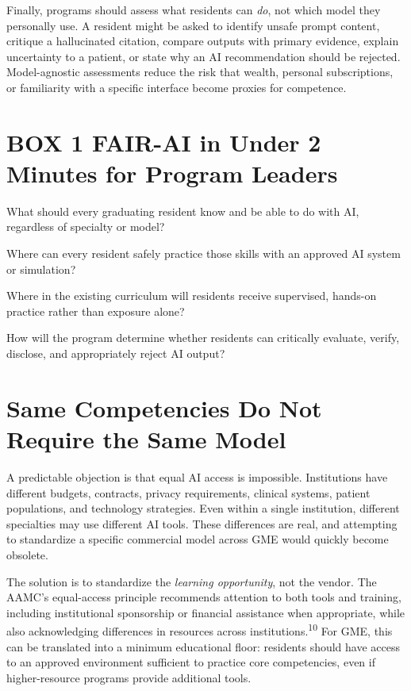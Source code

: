 \documentclass[12pt]{article}
\begin{document}
Finally, programs should assess what residents can \emph{do}, not which model
they personally use. A resident might be asked to identify unsafe prompt
content, critique a hallucinated citation, compare outputs with primary
evidence, explain uncertainty to a patient, or state why an AI recommendation
should be rejected. Model-agnostic assessments reduce the risk that wealth,
personal subscriptions, or familiarity with a specific interface become
proxies for competence.

\section*{BOX 1 \quad FAIR-AI in Under 2 Minutes for Program Leaders}

\begin{description}[style=nextline,leftmargin=0pt]
  \item[\textbf{F: Foundational expectations}]
  What should every graduating resident know and be able to do with AI,
  regardless of specialty or model?

  \item[\textbf{A: Access}]
  Where can every resident safely practice those skills with an approved AI
  system or simulation?

  \item[\textbf{I: Instruction}]
  Where in the existing curriculum will residents receive supervised,
  hands-on practice rather than exposure alone?

  \item[\textbf{R: Review}]
  How will the program determine whether residents can critically evaluate,
  verify, disclose, and appropriately reject AI output?
\end{description}

\section*{Same Competencies Do Not Require the Same Model}

A predictable objection is that equal AI access is impossible. Institutions
have different budgets, contracts, privacy requirements, clinical systems,
patient populations, and technology strategies. Even within a single
institution, different specialties may use different AI tools. These
differences are real, and attempting to standardize a specific commercial
model across GME would quickly become obsolete.

The solution is to standardize the \emph{learning opportunity}, not the
vendor. The AAMC's equal-access principle recommends attention to both tools
and training, including institutional sponsorship or financial assistance
when appropriate, while also acknowledging differences in resources across
institutions.\textsuperscript{10} For GME, this can be translated into a
minimum educational floor: residents should have access to an approved
environment sufficient to practice core competencies, even if higher-resource
programs provide additional tools.
\end{document}

